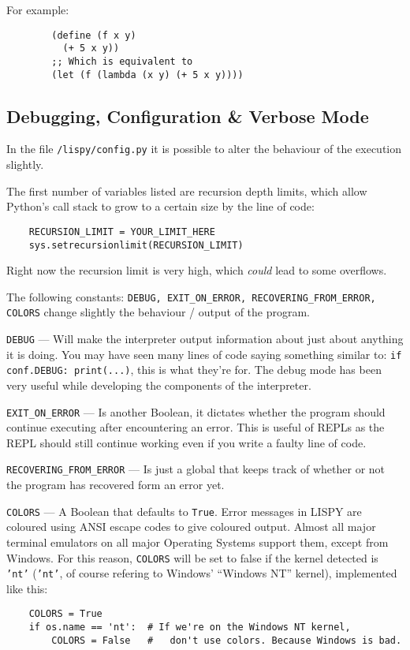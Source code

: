 \documentclass{article}
\newcommand{\code}[1]{\texttt{#1}}
\begin{document}
    For example:
      \begin{verbatim}
        (define (f x y)
          (+ 5 x y))
        ;; Which is equivalent to
        (let (f (lambda (x y) (+ 5 x y))))
      \end{verbatim}

    \clearpage

  \subsection{Debugging, Configuration \& Verbose Mode}
    In the file \code{/lispy/config.py} it is possible to alter
    the behaviour of the execution slightly.

    The first number of variables listed are recursion depth limits,
    which allow Python's call stack to grow to a certain size by
    the line of code:

    \begin{verbatim}
    RECURSION_LIMIT = YOUR_LIMIT_HERE
    sys.setrecursionlimit(RECURSION_LIMIT)
    \end{verbatim}

    Right now the recursion limit is very high, which \emph{could} lead
    to some overflows.

    The following constants: \code{DEBUG, EXIT\_ON\_ERROR, RECOVERING\_FROM\_ERROR,
    COLORS}
    change slightly the behaviour / output of the program.

    \code{DEBUG} --- Will make the interpreter output information about
    just about anything it is doing. You may have seen many lines of code
    saying something similar to: \code{if conf.DEBUG: print(...)},
    this is what they're for. The debug mode has been very useful while
    developing the components of the interpreter.

    \code{EXIT\_ON\_ERROR} --- Is another Boolean, it dictates whether the
    program should continue executing after encountering an error.
    This is useful of REPLs as the REPL should still continue working
    even if  you write a faulty line of code.

    \code{RECOVERING\_FROM\_ERROR} --- Is just a global that keeps
    track of whether or not the program has recovered form an error yet.

    \code{COLORS} --- A Boolean that defaults to \code{True}.
    Error messages in LISPY are coloured using ANSI escape codes to give
    coloured output. Almost all major terminal emulators on all major Operating
    Systems support them, except from Windows.  For this reason, \code{COLORS}
    will be set to false if the kernel detected is \code{'nt'} (\code{'nt'},
    of course refering to Windows' ``Windows NT'' kernel), implemented like this:
    \begin{verbatim}
    COLORS = True
    if os.name == 'nt':  # If we're on the Windows NT kernel,
        COLORS = False   #   don't use colors. Because Windows is bad.
    \end{verbatim}
\end{document}
